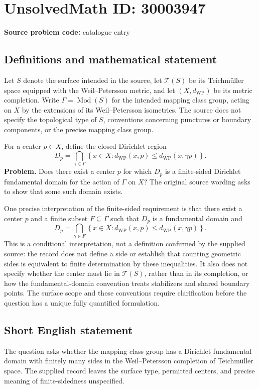 \documentclass[11pt]{article}
\begin{document}
\section*{UnsolvedMath ID: 30003947}
\textbf{Source problem code:} catalogue entry
\subsection{Definitions and mathematical statement}
Let \(S\) denote the surface intended in the source, let \(\mathcal T(S)\) be its Teichm\"uller space equipped with the Weil--Petersson metric, and let \((X,d_{\mathrm{WP}})\) be its metric completion. Write \(\Gamma=\operatorname{Mod}(S)\) for the intended mapping class group, acting on \(X\) by the extensions of its Weil--Petersson isometries. The source does not specify the topological type of \(S\), conventions concerning punctures or boundary components, or the precise mapping class group.

For a center \(p\in X\), define the closed Dirichlet region
\[
D_p=\bigcap_{\gamma\in\Gamma}\left\{x\in X: d_{\mathrm{WP}}(x,p)\leq d_{\mathrm{WP}}(x,\gamma p)\right\}.
\]
\textbf{Problem.} Does there exist a center \(p\) for which \(D_p\) is a finite-sided Dirichlet fundamental domain for the action of \(\Gamma\) on \(X\)? The original source wording asks to show that some such domain exists.

One precise interpretation of the finite-sided requirement is that there exist a center \(p\) and a finite subset \(F\subseteq\Gamma\) such that \(D_p\) is a fundamental domain and
\[
D_p=\bigcap_{\gamma\in F}\left\{x\in X: d_{\mathrm{WP}}(x,p)\leq d_{\mathrm{WP}}(x,\gamma p)\right\}.
\]
This is a conditional interpretation, not a definition confirmed by the supplied source: the record does not define a side or establish that counting geometric sides is equivalent to finite determination by these inequalities. It also does not specify whether the center must lie in \(\mathcal T(S)\), rather than in its completion, or how the fundamental-domain convention treats stabilizers and shared boundary points. The surface scope and these conventions require clarification before the question has a unique fully quantified formulation.
\subsection{Short English statement}
The question asks whether the mapping class group has a Dirichlet fundamental domain with finitely many sides in the Weil--Petersson completion of Teichm\"uller space. The supplied record leaves the surface type, permitted centers, and precise meaning of finite-sidedness unspecified.
\end{document}
